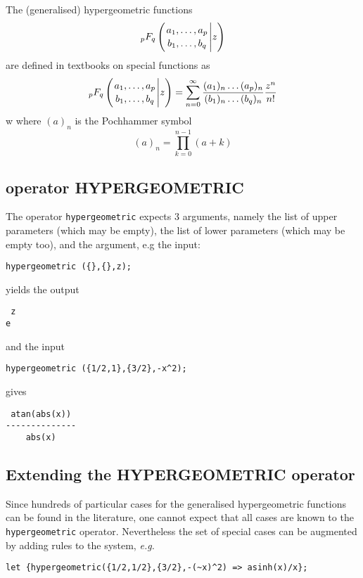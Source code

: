 
The (generalised) hypergeometric functions  
\begin{displaymath}
_pF_q \left( {{a_1, \ldots , a_p} \atop {b_1, \ldots ,b_q}} \Bigg\vert z \right)
\end{displaymath}
are defined in textbooks on special functions as
\begin{displaymath}
_pF_q \left( {{a_1, \ldots , a_p} \atop {b_1, \ldots ,b_q}} \Bigg\vert z \right)
  = \sum_{n=0}^{\infty}\frac{(a_{1})_{n}\dots(a_{p})_{n}}{(b_{1})_{n}\dots(b_{q})_{n}}\frac{z^{n}}{n!}
\end{displaymath}w
where $(a)_{n}$ is the Pochhammer symbol
\begin{displaymath}
 (a)_{n} = \prod_{k=0}^{n-1} (a+k)
\end{displaymath}


\subsection{\REDUCE{} operator HYPERGEOMETRIC}
\hypertarget{operator:HYPERGEOMETRIC}{}

The operator {\tt hypergeometric} expects 3 arguments, namely the 
list of upper parameters (which may be empty), the list of lower
parameters (which may be empty too), and the argument, e.g the input:
\begin{verbatim}
hypergeometric ({},{},z);
\end{verbatim}
yields the output
\begin{verbatim}
 z
e
\end{verbatim}
and the input
\begin{verbatim}
hypergeometric ({1/2,1},{3/2},-x^2);
\end{verbatim}
gives
\begin{verbatim}
 atan(abs(x))
--------------
    abs(x)
\end{verbatim}


\subsection{Extending the HYPERGEOMETRIC operator}

Since hundreds of particular cases for the generalised hypergeometric
functions can be found in the literature, one cannot expect that all
cases are known to the \texttt{hypergeometric} operator.
Nevertheless the set of special cases can be augmented by adding
rules to the \REDUCE{} system, {\em e.g.}
\begin{verbatim}
let {hypergeometric({1/2,1/2},{3/2},-(~x)^2) => asinh(x)/x};
\end{verbatim}
